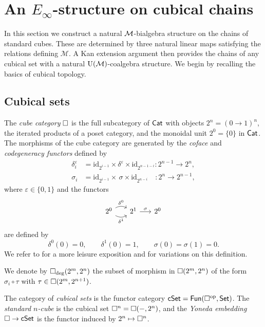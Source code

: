 
\section{An \texorpdfstring{$E_\infty$}{E-infty}-structure on cubical chains} \label{s:action}

In this section we construct a natural $\mathcal{M}$-bialgebra structure on the chains of standard cubes.
These are determined by three natural linear maps satisfying the relations defining $\mathcal M$.
A Kan extension argument then provides the chains of any cubical set with a natural ${\operatorname{U}(\mathcal{M})}$-coalgebra structure.
We begin by recalling the basics of cubical topology.

\subsection{Cubical sets}

The \textit{cube category} $\square$ is the full subcategory of $\mathsf{Cat}$ with objects $2^n = (0 \to 1)^n$, the iterated products of a poset category, and the monoidal unit $2^0 = \{0\}$ in $\mathsf{Cat}$.
The morphisms of the cube category are generated by the \textit{coface} and \textit{codegeneracy functors} defined by
\begin{align*}
\delta_i^\varepsilon & = \mathrm{id}_{2^{i-1}} \times \delta^\varepsilon \times \mathrm{id}_{2^{n-1-i}} \colon 2^{n-1} \to 2^n, \\
\sigma_i & = \mathrm{id}_{2^{i-1}} \times \, \sigma \times \mathrm{id}_{2^{n-i}} \quad \colon 2^{n} \to 2^{n-1},
\end{align*}
where $\varepsilon \in \{0,1\}$ and the functors
\[
\begin{tikzcd} [column sep=16pt]
2^0 \arrow[r, bend left, "\delta^0"] \arrow[r, bend right, "\delta^1"'] & 2^1 \arrow[r, "\sigma"] & 2^0
\end{tikzcd}
\]
are defined by
\[
\delta^0(0) = 0, \qquad \delta^1(0) = 1, \qquad \sigma(0) = \sigma(1) = 0.
\]
We refer to \cite{grandis2003cubical} for a more leisure exposition and for variations on this definition.

We denote by $\square_{\deg}(2^m, 2^n)$ the subset of morphism in $\square(2^m, 2^n)$ of the form $\sigma_i \circ \tau$ with $\tau \in \square(2^m, 2^{n+1})$.

The category of \textit{cubical sets} is the functor category $\mathsf{cSet} = \mathsf{Fun}(\square^{\mathrm{op}}, \mathsf{Set})$.
The \textit{standard $n$-cube} is the cubical set $\square^n = \square(-, 2^n)$, and the \textit{Yoneda embedding} $\square \to \mathsf{cSet}$ is the functor induced by $2^n \mapsto \square^n$.

